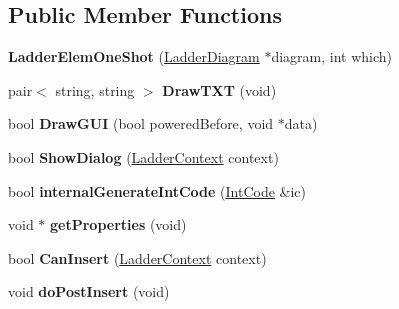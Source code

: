\subsection*{Public Member Functions}
\begin{DoxyCompactItemize}
\item 
\hypertarget{class_ladder_elem_one_shot_a966afd61bc9eefbab5e0d5c3007f5385}{{\bfseries Ladder\-Elem\-One\-Shot} (\hyperlink{class_ladder_diagram}{Ladder\-Diagram} $\ast$diagram, int which)}\label{class_ladder_elem_one_shot_a966afd61bc9eefbab5e0d5c3007f5385}

\item 
\hypertarget{class_ladder_elem_one_shot_a397740a3b18216b746e3b36f01440812}{pair$<$ string, string $>$ {\bfseries Draw\-T\-X\-T} (void)}\label{class_ladder_elem_one_shot_a397740a3b18216b746e3b36f01440812}

\item 
\hypertarget{class_ladder_elem_one_shot_ac20894401f7c2e3a97eaf6ca1e6bcdf3}{bool {\bfseries Draw\-G\-U\-I} (bool powered\-Before, void $\ast$data)}\label{class_ladder_elem_one_shot_ac20894401f7c2e3a97eaf6ca1e6bcdf3}

\item 
\hypertarget{class_ladder_elem_one_shot_a11827bfe25521283b3e2c1131f734e5c}{bool {\bfseries Show\-Dialog} (\hyperlink{struct_ladder_context}{Ladder\-Context} context)}\label{class_ladder_elem_one_shot_a11827bfe25521283b3e2c1131f734e5c}

\item 
\hypertarget{class_ladder_elem_one_shot_a4a3df55397821928d9591905337ae832}{bool {\bfseries internal\-Generate\-Int\-Code} (\hyperlink{class_int_code}{Int\-Code} \&ic)}\label{class_ladder_elem_one_shot_a4a3df55397821928d9591905337ae832}

\item 
\hypertarget{class_ladder_elem_one_shot_a577d55f38ddc6e1039eb5317da139251}{void $\ast$ {\bfseries get\-Properties} (void)}\label{class_ladder_elem_one_shot_a577d55f38ddc6e1039eb5317da139251}

\item 
\hypertarget{class_ladder_elem_one_shot_a0891e800a3c10fd28f7d688cda2de736}{bool {\bfseries Can\-Insert} (\hyperlink{struct_ladder_context}{Ladder\-Context} context)}\label{class_ladder_elem_one_shot_a0891e800a3c10fd28f7d688cda2de736}

\item 
\hypertarget{class_ladder_elem_one_shot_add9906184b5a6123877a450d4a087646}{void {\bfseries do\-Post\-Insert} (void)}\label{class_ladder_elem_one_shot_add9906184b5a6123877a450d4a087646}


\end{DoxyCompactItemize}
